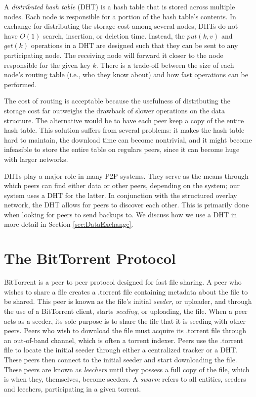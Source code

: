 \documentclass[12pt]{report}
\begin{document}
A \textit{distributed hash table} (DHT) is a hash table that is stored across multiple nodes. Each node is responsible for a portion of the hash table's contents. In exchange for distributing the storage cost among several nodes, DHTs do not have $O(1)$ search, insertion, or deletion time. Instead, the $put(k, v)$ and $get(k)$ operations in a DHT are designed such that they can be sent to any participating node. The receiving node will forward it closer to the node responsible for the given key $k$. There is a trade-off between the size of each node's routing table (i.e., who they know about) and how fast operations can be performed.

The cost of routing is acceptable because the usefulness of distributing the storage cost far outweighs the drawback of slower operations on the data structure. The alternative would be to have each peer keep a copy of the entire hash table. This solution suffers from several problems: it makes the hash table hard to maintain, the download time can become nontrivial, and it might become infeasible to store the entire table on regulars peers, since it can become huge with larger networks.




DHTs play a major role in many P2P systems. They serve as the means through which peers can find either data or other peers, depending on the system; our system uses a DHT for the latter. In conjunction with the structured overlay network, the DHT allows for peers to discover each other. This is primarily done when looking for peers to send backups to. We discuss how we use a DHT in more detail in Section \ref{sec:DataExchange}.

\section{The BitTorrent Protocol} \label{sec:TheBitTorrentProtocol}
BitTorrent is a peer to peer protocol designed for fast file sharing. A peer who wishes to share a file creates a .torrent file containing metadata about the file to be shared. This peer is known as the file's initial \textit{seeder}, or uploader, and through the use of a BitTorrent client, starts \textit{seeding}, or uploading, the file. When a peer acts as a seeder, its sole purpose is to share the file that it is seeding with other peers. Peers who wish to download the file must acquire its .torrent file through an out-of-band channel, which is often a torrent indexer. Peers use the .torrent file to locate the initial seeder through either a centralized tracker or a DHT. These peers then connect to the initial seeder and start downloading the file. These peers are known as \textit{leechers} until they possess a full copy of the file, which is when they, themselves, become seeders. A \textit{swarm} refers to all entities, seeders and leechers, participating in a given torrent.
\end{document}
